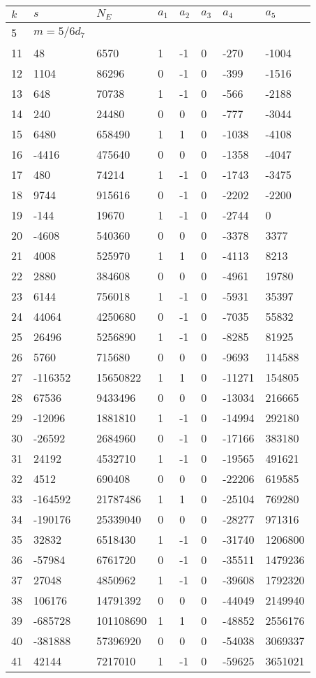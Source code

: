 \documentclass{amsart}
\begin{document}
\begin{longtable}{|l|l|l|lllll|}
\hline
$k$ & $s$ & $N_E$ & $a_1$ & $a_2$ & $a_3$ & $a_4$ & $a_5$\\
\hline
5&$m=5/6d_{7}$&&\multicolumn{5}{c|}{}\\
11&48&6570&1&-1&0&-270&-1004\\
12&1104&86296&0&-1&0&-399&-1516\\
13&648&70738&1&-1&0&-566&-2188\\
14&240&24480&0&0&0&-777&-3044\\
15&6480&658490&1&1&0&-1038&-4108\\
16&-4416&475640&0&0&0&-1358&-4047\\
17&480&74214&1&-1&0&-1743&-3475\\
18&9744&915616&0&-1&0&-2202&-2200\\
19&-144&19670&1&-1&0&-2744&0\\
20&-4608&540360&0&0&0&-3378&3377\\
21&4008&525970&1&1&0&-4113&8213\\
22&2880&384608&0&0&0&-4961&19780\\
23&6144&756018&1&-1&0&-5931&35397\\
24&44064&4250680&0&-1&0&-7035&55832\\
25&26496&5256890&1&-1&0&-8285&81925\\
26&5760&715680&0&0&0&-9693&114588\\
27&-116352&15650822&1&1&0&-11271&154805\\
28&67536&9433496&0&0&0&-13034&216665\\
29&-12096&1881810&1&-1&0&-14994&292180\\
30&-26592&2684960&0&-1&0&-17166&383180\\
31&24192&4532710&1&-1&0&-19565&491621\\
32&4512&690408&0&0&0&-22206&619585\\
33&-164592&21787486&1&1&0&-25104&769280\\
34&-190176&25339040&0&0&0&-28277&971316\\
35&32832&6518430&1&-1&0&-31740&1206800\\
36&-57984&6761720&0&-1&0&-35511&1479236\\
37&27048&4850962&1&-1&0&-39608&1792320\\
38&106176&14791392&0&0&0&-44049&2149940\\
39&-685728&101108690&1&1&0&-48852&2556176\\
40&-381888&57396920&0&0&0&-54038&3069337\\
41&42144&7217010&1&-1&0&-59625&3651021\\

\end{longtable}
\end{document}
